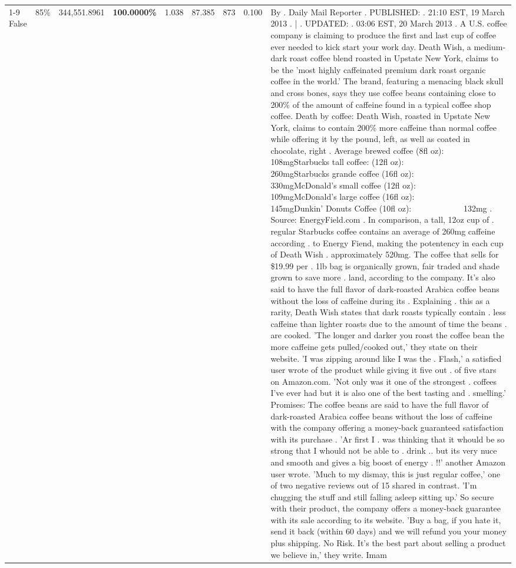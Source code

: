 \begin{table}[H]
{\begin{tabular}{lllrlllll}
\cline{1-9} \cline{2-9}
False & 85\% & 344,551.8961 & \bfseries \color{red} 100.0000\% & 1.038 & 87.385 & 873 & 0.100 & By . Daily Mail Reporter . PUBLISHED: . 21:10 EST, 19 March 2013 . | . UPDATED: . 03:06 EST, 20 March 2013 . A U.S. coffee company is claiming to produce the first and last cup of coffee ever needed to kick start your work day. Death Wish, a medium-dark roast coffee blend roasted in Upstate New York, claims to be the 'most highly caffeinated premium dark roast organic coffee in the world.' The brand, featuring a menacing black skull and cross bones, says they use coffee beans containing close to 200\% of the amount of caffeine found in a typical coffee shop coffee. Death by coffee: Death Wish, roasted in Upstate New York, claims to contain 200\% more caffeine than normal coffee while offering it by the pound, left, as well as coated in chocolate, right . Average brewed coffee (8fl oz):              108mgStarbucks tall coffee: (12fl oz):                260mgStarbucks grande coffee (16fl oz):         330mgMcDonald's small coffee (12fl oz):           109mgMcDonald's large coffee (16fl oz):           145mgDunkin' Donuts Coffee (10fl oz):             132mg . Source: EnergyField.com . In comparison, a tall, 12oz cup of . regular Starbucks coffee contains an average of 260mg caffeine according . to Energy Fiend, making the potentency in each cup of Death Wish . approximately 520mg. The coffee that sells for \$19.99 per . 1lb bag is organically grown, fair traded and shade grown to save more . land, according to the company. It's also said to have the full flavor of dark-roasted Arabica coffee beans without the loss of caffeine during its . Explaining . this as a rarity, Death Wish states that dark roasts typically contain . less caffeine than lighter roasts due to the amount of time the beans . are cooked. 'The longer and darker you roast the coffee bean the more caffeine gets pulled/cooked out,' they state on their website. 'I was zipping around like I was the . Flash,' a satisfied user wrote of the product while giving it five out . of five stars on Amazon.com. 'Not only was it one of the strongest . coffees I've ever had but it is also one of the best tasting and . smelling.’ Promises: The coffee beans are said to have the full flavor of dark-roasted Arabica coffee beans without the loss of caffeine with the company offering a money-back guaranteed satisfaction with its purchase . 'Ar first I . was thinking that it whould be so strong that I whould not be able to . drink .. but its very nuce and smooth and gives a big boost of energy . !!' another Amazon user wrote. 'Much to my dismay, this is just regular coffee,' one of two negative reviews out of 15 shared in contrast. 'I'm chugging the stuff and still falling asleep sitting up.' So secure with their product, the company offers a money-back guarantee with its sale according to its website. 'Buy a bag, if you hate it, send it back (within 60 days) and we will refund you your money plus shipping. No Risk. It’s the best part about selling a product we believe in,' they write. Imam \\

\end{tabular}}
\end{table}
